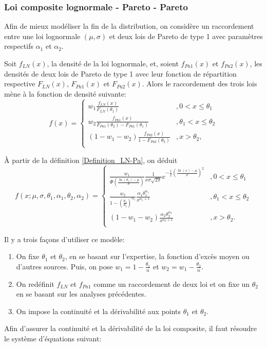 	\subsubsection{Loi composite lognormale - Pareto - Pareto} 
	Afin de mieux modéliser la fin de la distribution, on considère un raccordement entre une loi lognormale $(\mu,\sigma)$ et deux lois de Pareto de type 1 avec paramètres respectifs $\alpha_1$ et $\alpha_2$.
	\begin{Definition}\label{Definition_LN-Pa}
		Soit $f_{LN}(x)$, la densité de la loi lognormale, et, soient $f_{Pa1}(x)$ et $f_{Pa2}(x)$, les densités de deux lois de Pareto de type 1 avec leur fonction de répartition respective $F_{LN}(x)$, $F_{Pa1}(x)$ et $F_{Pa2}(x)$. Alors le raccordement des trois lois mène à la fonction de densité suivante: 	
		$$
			f(x) = \left\{
			\begin{array}{ll}
				w_1 \frac{f_{LN}(x)}{F_{LN}(\theta_1)} & ,0 < x \leq \theta_1 \\
				w_2 \frac{f_{Pa1}(x)}{F_{Pa1}(\theta_2)-F_{Pa1}(\theta_1)} & ,\theta_1 < x \leq \theta_2 \\
				(1-w_1-w_2) \frac{f_{Pa2}(x)}{1-F_{Pa2}(\theta_2)} & , x > \theta_2,  \\
			\end{array}
			\right.
		$$
	\end{Definition}
	
	À partir de la définition \ref{Definition_LN-Pa}, on déduit
	$$
		f(x;\mu,\sigma,\theta_1,\alpha_1,\theta_2,\alpha_2) = \left\{
		\begin{array}{ll}
			\frac{w_1}{\Phi\left(\frac{\ln(\theta_1)-\mu}{\sigma}\right)} \frac{1}{x \sigma \sqrt{2 \pi}} e^{-\frac{1}{2} \left( \frac{\ln(x)- \mu}{\sigma} \right)^2} & ,0 < x \leq \theta_1 \\
			\frac{w_2}{1-\left(\frac{\theta_1}{\theta_2}\right)^{\alpha_1}} \frac{\alpha_1 \theta_1^{\alpha_1}}{x^{\alpha_1+1}}  & ,\theta_1 < x \leq \theta_2 \\
			(1-w_1-w_2) \frac{\alpha_2 \theta_2^{\alpha_2}}{x^{\alpha_2+1}}  & , x > \theta_2.  \\
		\end{array}
		\right.
	$$	
	
	Il y a trois façons d'utiliser ce modèle:
	\begin{enumerate}
		\item On fixe $\theta_1$ et $\theta_2$, en se basant sur l'expertise, la fonction d'excès moyen ou d'autres sources. Puis, on pose $w_1 = 1-\frac{\theta_1}{n}$ et $w_2= w_1 - \frac{\theta_2}{n}$. 
		\item On redéfinit $f_{LN}$ et $f_{Pa1}$ comme un raccordement de deux loi et on fixe un $\theta_2$ en se basant sur les analyses précédentes.
		\item On impose la continuité et la dérivabilité aux points $\theta_1$ et $\theta_2$. \\
	\end{enumerate}
	Afin d'assurer la continuité et la dérivabilité de la loi composite, il faut résoudre le système d'équations suivant:
	
